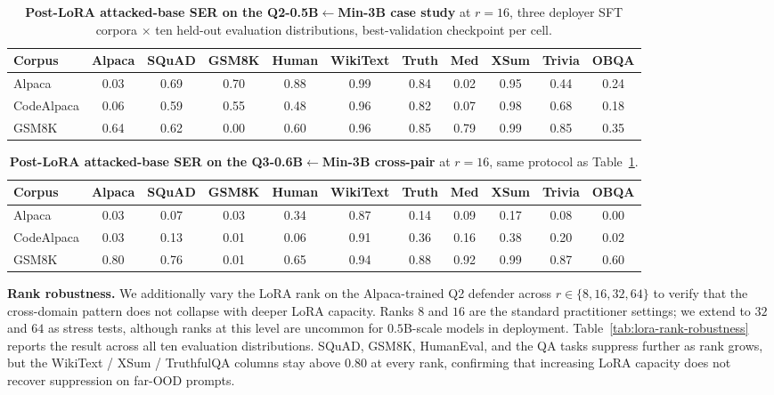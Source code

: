 \begin{table}[!htbp]
\centering
\small
\setlength{\tabcolsep}{4pt}
\caption{\textbf{Post-LoRA attacked-base SER on the Q2-0.5B$\leftarrow$Min-3B case study} at $r{=}16$, three deployer SFT corpora $\times$ ten held-out evaluation distributions, best-validation checkpoint per cell.}
\label{tab:lora-cross-domain}
\begin{tabular}{lcccccccccc}
\toprule
Corpus & Alpaca & SQuAD & GSM8K & Human & WikiText & Truth & Med & XSum & Trivia & OBQA \\
\midrule
Alpaca       & 0.03 & 0.69 & 0.70 & 0.88 & 0.99 & 0.84 & 0.02 & 0.95 & 0.44 & 0.24 \\
CodeAlpaca   & 0.06 & 0.59 & 0.55 & 0.48 & 0.96 & 0.82 & 0.07 & 0.98 & 0.68 & 0.18 \\
GSM8K        & 0.64 & 0.62 & 0.00 & 0.60 & 0.96 & 0.85 & 0.79 & 0.99 & 0.85 & 0.35 \\
\bottomrule
\end{tabular}
\end{table}

\begin{table}[!htbp]
\centering
\small
\setlength{\tabcolsep}{4pt}
\caption{\textbf{Post-LoRA attacked-base SER on the Q3-0.6B$\leftarrow$Min-3B cross-pair} at $r{=}16$, same protocol as Table~\ref{tab:lora-cross-domain}.}
\label{tab:lora-cross-domain-q3}
\begin{tabular}{lcccccccccc}
\toprule
Corpus & Alpaca & SQuAD & GSM8K & Human & WikiText & Truth & Med & XSum & Trivia & OBQA \\
\midrule
Alpaca       & 0.03 & 0.07 & 0.03 & 0.34 & 0.87 & 0.14 & 0.09 & 0.17 & 0.08 & 0.00 \\
CodeAlpaca   & 0.03 & 0.13 & 0.01 & 0.06 & 0.91 & 0.36 & 0.16 & 0.38 & 0.20 & 0.02 \\
GSM8K        & 0.80 & 0.76 & 0.01 & 0.65 & 0.94 & 0.88 & 0.92 & 0.99 & 0.87 & 0.60 \\
\bottomrule
\end{tabular}
\end{table}

\noindent\textbf{Rank robustness.}
We additionally vary the LoRA rank on the Alpaca-trained Q2 defender across $r\in\{8,16,32,64\}$ to verify that the cross-domain pattern does not collapse with deeper LoRA capacity. Ranks $8$ and $16$ are the standard practitioner settings; we extend to $32$ and $64$ as stress tests, although ranks at this level are uncommon for $0.5$B-scale models in deployment. Table~\ref{tab:lora-rank-robustness} reports the result across all ten evaluation distributions. SQuAD, GSM8K, HumanEval, and the QA tasks suppress further as rank grows, but the WikiText / XSum / TruthfulQA columns stay above $0.80$ at every rank, confirming that increasing LoRA capacity does not recover suppression on far-OOD prompts.

